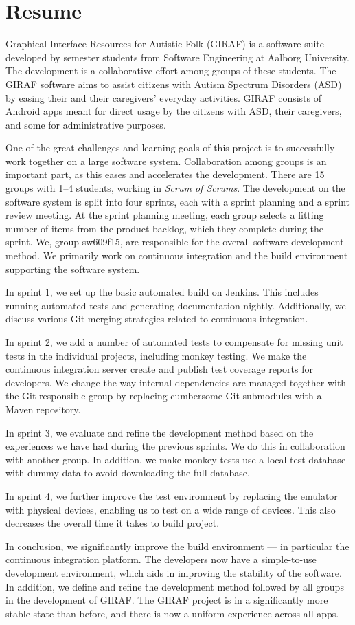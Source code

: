 \chapter*{Resume}
Graphical Interface Resources for Autistic Folk (GIRAF) is a software suite developed by  semester students from Software Engineering at Aalborg University. The development is a collaborative effort among groups of these students. The GIRAF software aims to assist citizens with Autism Spectrum Disorders (ASD) by easing their and their caregivers' everyday activities. GIRAF consists of Android apps meant for direct usage by the citizens with ASD, their caregivers, and some for administrative purposes.

One of the great challenges and learning goals of this project is to successfully work together on a large software system. Collaboration among groups is an important part, as this eases and accelerates the development. There are 15 groups with 1--4 students, working in \emph{Scrum of Scrums}. The development on the software system is split into four sprints, each with a sprint planning and a sprint review meeting. At the sprint planning meeting, each group selects a fitting number of items from the product backlog, which they complete during the sprint. We, group sw609f15, are responsible for the overall software development method. We primarily work on continuous integration and the build environment supporting the software system.

In sprint 1, we set up the basic automated build on Jenkins. This includes running automated tests and generating documentation nightly. Additionally, we discuss various Git merging strategies related to continuous integration.

In sprint 2, we add a number of automated tests to compensate for missing unit tests in the individual projects, including monkey testing. We make the continuous integration server create and publish test coverage reports for developers. We change the way internal dependencies are managed together with the Git-responsible group by replacing cumbersome Git submodules with a Maven repository.

In sprint 3, we evaluate and refine the development method based on the experiences we have had during the previous sprints. We do this in collaboration with another group. In addition, we make monkey tests use a local test database with dummy data to avoid downloading the full database.

In sprint 4, we further improve the test environment by replacing the emulator with physical devices, enabling us to test on a wide range of devices. This also decreases the overall time it takes to build project.

In conclusion, we significantly improve the build environment --- in particular the continuous integration platform. The developers now have a simple-to-use development environment, which aids in improving the stability of the software. In addition, we define and refine the development method followed by all groups in the development of GIRAF\@. The GIRAF project is in a significantly more stable state than before, and there is now a uniform experience across all apps.